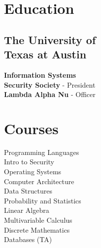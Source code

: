 \documentclass[]{deedy-template}
\begin{document}
%
%
\lastupdated

%
%

%
%

\begin{minipage}[t]{0.3\textwidth}


\section{Education}

    \subsection[]{The University of \\ Texas at Austin}
        \textbf{Information Systems \\ Security Society} - President \\
        \textbf{Lambda Alpha Nu} - Officer

%
%

\section{Courses}
Programming Languages \\
Intro to Security \\
Operating Systems \\
Computer Architecture \\
Data Structures \\
Probability and Statistics \\
Linear Algebra \\
Multivariable Calculus \\
Discrete Mathematics \\
Databases (TA)



\end{minipage}
\end{document}

